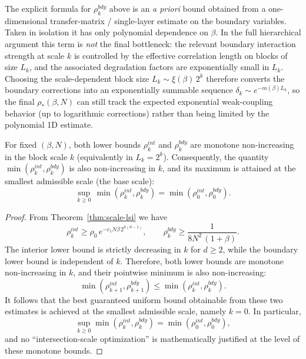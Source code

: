 \begin{remark}
The explicit formula for $\rho_k^{bdy}$ above is an \emph{a priori} bound obtained from a one-dimensional transfer-matrix / single-layer estimate on the boundary variables.
Taken in isolation it has only polynomial dependence on $\beta$.
In the full hierarchical argument this term is \emph{not} the final bottleneck: the relevant boundary interaction strength at scale $k$ is controlled by the effective correlation length on blocks of size $L_k$, and the associated degradation factors are exponentially small in $L_k$.
Choosing the scale-dependent block size $L_k \sim \xi(\beta)\,2^k$ therefore converts the boundary corrections into an exponentially summable sequence $\delta_k \sim e^{-m(\beta) L_k}$, so the final $\rho_*(\beta,N)$ can still track the expected exponential weak-coupling behavior (up to logarithmic corrections) rather than being limited by the polynomial 1D estimate.
\end{remark}

\begin{theorem}
\label{thm:optimal-scale}
For fixed $(\beta,N)$, both lower bounds $\rho_k^{int}$ and $\rho_k^{bdy}$ are
monotone non-increasing in the block scale $k$ (equivalently in $L_k=2^k$).
Consequently, the quantity $\min(\rho_k^{int},\rho_k^{bdy})$ is also
non-increasing in $k$, and its maximum is attained at the smallest admissible
scale (the base scale):
\begin{equation}
\sup_{k \ge 0}\, \min(\rho_k^{int}, \rho_k^{bdy})
= \min(\rho_0^{int}, \rho_0^{bdy}).
\end{equation}
\end{theorem}

\begin{proof}
From Theorem~\ref{thm:scale-lsi} we have
\[
\rho_k^{int} \ge \rho_0\, e^{-c_1 N\beta\, 2^{k(d-1)}},
\qquad
\rho_k^{bdy} \ge \frac{1}{8N^2\,(1+\beta)}.
\]
The interior lower bound is strictly decreasing in $k$ for $d\ge 2$, while the
boundary lower bound is independent of $k$. Therefore, both lower bounds are
monotone non-increasing in $k$, and their pointwise minimum is also
non-increasing:
\[
\min(\rho_{k+1}^{int},\rho_{k+1}^{bdy}) \le \min(\rho_k^{int},\rho_k^{bdy}).
\]
It follows that the best guaranteed uniform bound obtainable from these two
estimates is achieved at the smallest admissible scale, namely $k=0$.
In particular,
\[
\sup_{k\ge 0}\min(\rho_k^{int},\rho_k^{bdy}) = \min(\rho_0^{int},\rho_0^{bdy}),
\]
and no ``intersection-scale optimization'' is mathematically justified at the
level of these monotone bounds.
\end{proof}

